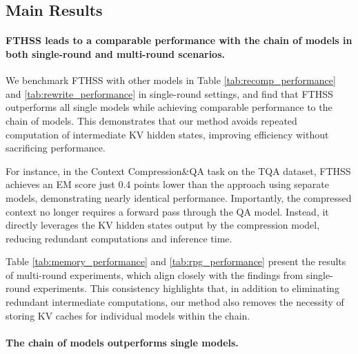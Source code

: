 \subsection{Main Results}
\paragraph{FTHSS leads to a comparable performance with the chain of models in both single-round and multi-round scenarios.}
We benchmark FTHSS with other models in Table \ref{tab:recomp_performance} and \ref{tab:rewrite_performance} in single-round settings, and find that FTHSS outperforms all single models while achieving comparable performance  to the chain of models. This demonstrates that our method avoids repeated computation of intermediate KV hidden states, improving efficiency without sacrificing performance.

For instance, in the Context Compression\&QA task on the TQA dataset, FTHSS achieves an EM score just 0.4 points lower than the approach using separate models, demonstrating nearly identical performance. Importantly, the compressed context no longer requires a forward pass through the QA model. Instead, it directly leverages the KV hidden states output by the compression model, reducing redundant computations and inference time.

Table \ref{tab:memory_performance} and \ref{tab:rpg_performance} present the results of multi-round experiments, which align closely with the findings from single-round experiments. This consistency highlights that, in addition to eliminating redundant intermediate computations, our method also removes the necessity of storing KV caches for individual models within the chain.


\paragraph{The chain of models outperforms single models.}

